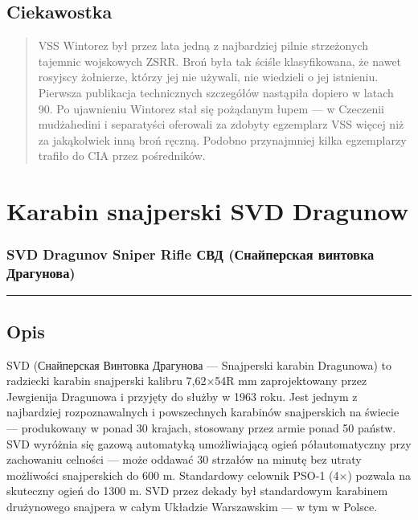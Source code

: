 \documentclass[12pt,openany,oneside]{book}
\begin{document}
\section{Ciekawostka}\label{ciekawostka-61}

\begin{quote}
VSS Wintorez był przez lata jedną z najbardziej pilnie strzeżonych
tajemnic wojskowych ZSRR. Broń była tak ściśle klasyfikowana, że nawet
rosyjscy żołnierze, którzy jej nie używali, nie wiedzieli o jej
istnieniu. Pierwsza publikacja technicznych szczegółów nastąpiła dopiero
w latach 90. Po ujawnieniu Wintorez stał się pożądanym łupem --- w
Czeczenii mudżahedini i separatyści oferowali za zdobyty egzemplarz VSS
więcej niż za jakąkolwiek inną broń ręczną. Podobno przynajmniej kilka
egzemplarzy trafiło do CIA przez pośredników.
\end{quote}

\chapter{Karabin snajperski SVD
Dragunow}\label{karabin-snajperski-svd-dragunow}

\subsection{SVD Dragunov Sniper Rifle \textbar{} СВД (Снайперская
винтовка
Драгунова)}\label{svd-dragunov-sniper-rifle-ux441ux432ux434-ux441ux43dux430ux439ux43fux435ux440ux441ux43aux430ux44f-ux432ux438ux43dux442ux43eux432ux43aux430-ux434ux440ux430ux433ux443ux43dux43eux432ux430}

\begin{center}\rule{0.5\linewidth}{0.5pt}\end{center}

\section{Opis}\label{opis-62}

SVD (Снайперская Винтовка Драгунова --- Snajperski karabin Dragunowa) to
radziecki karabin snajperski kalibru 7,62×54R mm zaprojektowany przez
Jewgienija Dragunowa i przyjęty do służby w 1963 roku. Jest jednym z
najbardziej rozpoznawalnych i powszechnych karabinów snajperskich na
świecie --- produkowany w ponad 30 krajach, stosowany przez armie ponad
50 państw. SVD wyróżnia się gazową automatyką umożliwiającą ogień
półautomatyczny przy zachowaniu celności --- może oddawać 30 strzałów na
minutę bez utraty możliwości snajperskich do 600 m. Standardowy celownik
PSO-1 (4×) pozwala na skuteczny ogień do 1300 m. SVD przez dekady był
standardowym karabinem drużynowego snajpera w całym Układzie Warszawskim
--- w tym w Polsce.
\end{document}

